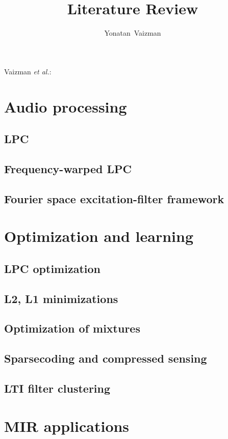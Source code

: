 \documentclass[journal]{IEEEtran}
\begin{document}
%
\title{Literature Review}
\author{Yonatan~Vaizman}

\markboth{}%
{Vaizman \MakeLowercase{\textit{et al.}}: }

\maketitle



\section{Audio processing}
\subsection{LPC}
\subsection{Frequency-warped LPC}
\subsection{Fourier space excitation-filter framework}

\section{Optimization and learning}
\subsection{LPC optimization}
\subsection{L2, L1 minimizations}
\subsection{Optimization of mixtures}
\subsection{Sparsecoding and compressed sensing}
\subsection{LTI filter clustering}

\section{MIR applications}
\end{document}
